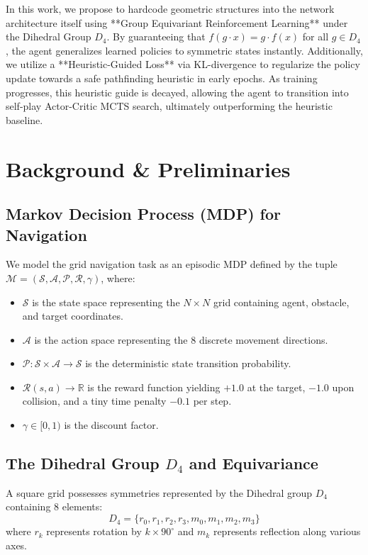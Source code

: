 \documentclass{article}
\begin{document}
In this work, we propose to hardcode geometric structures into the network architecture itself using **Group Equivariant Reinforcement Learning** under the Dihedral Group $D_4$. By guaranteeing that $f(g \cdot x) = g \cdot f(x)$ for all $g \in D_4$, the agent generalizes learned policies to symmetric states instantly. Additionally, we utilize a **Heuristic-Guided Loss** via KL-divergence to regularize the policy update towards a safe pathfinding heuristic in early epochs. As training progresses, this heuristic guide is decayed, allowing the agent to transition into self-play Actor-Critic MCTS search, ultimately outperforming the heuristic baseline.

\section{Background \& Preliminaries}

\subsection{Markov Decision Process (MDP) for Navigation}
We model the grid navigation task as an episodic MDP defined by the tuple $\mathcal{M} = (\mathcal{S}, \mathcal{A}, \mathcal{P}, \mathcal{R}, \gamma)$, where:
\begin{itemize}
    \item $\mathcal{S}$ is the state space representing the $N \times N$ grid containing agent, obstacle, and target coordinates.
    \item $\mathcal{A}$ is the action space representing the 8 discrete movement directions.
    \item $\mathcal{P}: \mathcal{S} \times \mathcal{A} \to \mathcal{S}$ is the deterministic state transition probability.
    \item $\mathcal{R}(s, a) \to \mathbb{R}$ is the reward function yielding $+1.0$ at the target, $-1.0$ upon collision, and a tiny time penalty $-0.1$ per step.
    \item $\gamma \in [0, 1)$ is the discount factor.
\end{itemize}

\subsection{The Dihedral Group $D_4$ and Equivariance}
A square grid possesses symmetries represented by the Dihedral group $D_4$ containing 8 elements:
\begin{equation}
    D_4 = \{ r_0, r_1, r_2, r_3, m_0, m_1, m_2, m_3 \}
\end{equation}
where $r_k$ represents rotation by $k \times 90^\circ$ and $m_k$ represents reflection along various axes.
\end{document}
